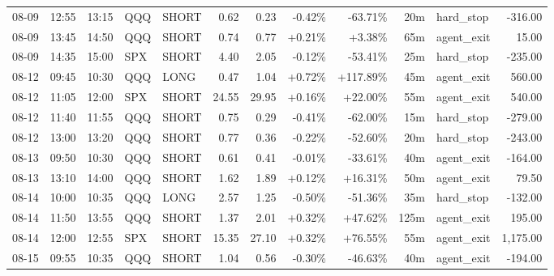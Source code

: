 \documentclass[11pt,a4paper,twoside]{article}
\begin{document}
\begin{center}
\begin{longtable}{>{\color{txtmain}}l l l l l r r r r r >{\color{txtmain}}l r}
08-09 & 12:55 & 13:15 & QQQ & SHORT & 0.62 & 0.23 & \textcolor{lossred}{-0.42\%} & \textcolor{lossred}{-63.71\%} & 20m & hard\_stop & \textcolor{lossred}{-316.00} \\
08-09 & 13:45 & 14:50 & QQQ & SHORT & 0.74 & 0.77 & \textcolor{wingreen}{+0.21\%} & \textcolor{wingreen}{+3.38\%} & 65m & agent\_exit & \textcolor{wingreen}{15.00} \\
08-09 & 14:35 & 15:00 & SPX & SHORT & 4.40 & 2.05 & \textcolor{lossred}{-0.12\%} & \textcolor{lossred}{-53.41\%} & 25m & hard\_stop & \textcolor{lossred}{-235.00} \\
08-12 & 09:45 & 10:30 & QQQ & LONG & 0.47 & 1.04 & \textcolor{wingreen}{+0.72\%} & \textcolor{wingreen}{+117.89\%} & 45m & agent\_exit & \textcolor{wingreen}{560.00} \\
08-12 & 11:05 & 12:00 & SPX & SHORT & 24.55 & 29.95 & \textcolor{wingreen}{+0.16\%} & \textcolor{wingreen}{+22.00\%} & 55m & agent\_exit & \textcolor{wingreen}{540.00} \\
08-12 & 11:40 & 11:55 & QQQ & SHORT & 0.75 & 0.29 & \textcolor{lossred}{-0.41\%} & \textcolor{lossred}{-62.00\%} & 15m & hard\_stop & \textcolor{lossred}{-279.00} \\
08-12 & 13:00 & 13:20 & QQQ & SHORT & 0.77 & 0.36 & \textcolor{lossred}{-0.22\%} & \textcolor{lossred}{-52.60\%} & 20m & hard\_stop & \textcolor{lossred}{-243.00} \\
08-13 & 09:50 & 10:30 & QQQ & SHORT & 0.61 & 0.41 & \textcolor{lossred}{-0.01\%} & \textcolor{lossred}{-33.61\%} & 40m & agent\_exit & \textcolor{lossred}{-164.00} \\
08-13 & 13:10 & 14:00 & QQQ & SHORT & 1.62 & 1.89 & \textcolor{wingreen}{+0.12\%} & \textcolor{wingreen}{+16.31\%} & 50m & agent\_exit & \textcolor{wingreen}{79.50} \\
08-14 & 10:00 & 10:35 & QQQ & LONG & 2.57 & 1.25 & \textcolor{lossred}{-0.50\%} & \textcolor{lossred}{-51.36\%} & 35m & hard\_stop & \textcolor{lossred}{-132.00} \\
08-14 & 11:50 & 13:55 & QQQ & SHORT & 1.37 & 2.01 & \textcolor{wingreen}{+0.32\%} & \textcolor{wingreen}{+47.62\%} & 125m & agent\_exit & \textcolor{wingreen}{195.00} \\
08-14 & 12:00 & 12:55 & SPX & SHORT & 15.35 & 27.10 & \textcolor{wingreen}{+0.32\%} & \textcolor{wingreen}{+76.55\%} & 55m & agent\_exit & \textcolor{wingreen}{1,175.00} \\
08-15 & 09:55 & 10:35 & QQQ & SHORT & 1.04 & 0.56 & \textcolor{lossred}{-0.30\%} & \textcolor{lossred}{-46.63\%} & 40m & agent\_exit & \textcolor{lossred}{-194.00} \\

\end{longtable}
\end{center}
\end{document}
